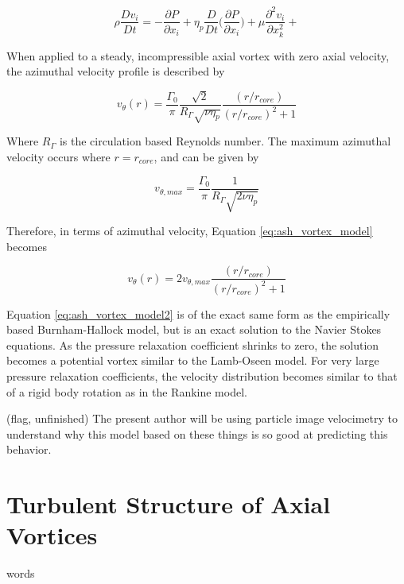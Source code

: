 \begin{equation}
\rho \frac{Dv_i}{Dt} = -\frac{\partial P}{\partial x_i} +
\eta_p \frac{D}{Dt} \Bigg( \frac{\partial P}{\partial x_i} \Bigg) + 
\mu \frac{\partial^2 v_i}{\partial x_{k}^2} + 
\label{eq:modified_ns4}
\end{equation}

When applied to a steady, incompressible axial vortex with zero axial velocity, 
the azimuthal velocity profile is described by

\begin{equation}
v_\theta(r) = \frac{\Gamma_0}{\pi} \frac{\sqrt{2}}{R_\Gamma \sqrt{\nu \eta_p}}
\frac{(r / r_{core})}{(r/r_{core})^2 + 1}
\label{eq:ash_vortex_model}
\end{equation}

\noindent
Where $R_\Gamma$ is the circulation based Reynolds number. The maximum 
azimuthal velocity occurs where $r = r_{core}$, and can be given by 

\begin{equation}
v_{\theta, max} = \frac{\Gamma_0}{\pi} \frac{1}{R_\Gamma \sqrt{2 \nu 
\eta_p}}
\label{eq:ash_vthetamax}
\end{equation}

\noindent
Therefore, in terms of azimuthal velocity, Equation \ref{eq:ash_vortex_model} 
becomes

\begin{equation}
v_\theta(r) = 2 v_{\theta, max}\frac{(r / r_{core})}{(r/r_{core})^2 + 1}
\label{eq:ash_vortex_model2}
\end{equation}

Equation \ref{eq:ash_vortex_model2} is of the exact same form as the 
empirically based Burnham-Hallock model, but is an exact solution to the Navier 
Stokes equations. As the pressure relaxation coefficient shrinks to zero, the 
solution becomes a potential vortex similar to the Lamb-Oseen model. For very 
large pressure relaxation coefficients, the velocity distribution becomes 
similar to that of a rigid body rotation as in the Rankine model. 

(flag, unfinished) The present author will be using particle image velocimetry 
to understand why this model based on these things is so good at predicting 
this behavior.

\section{Turbulent Structure of Axial Vortices}
words